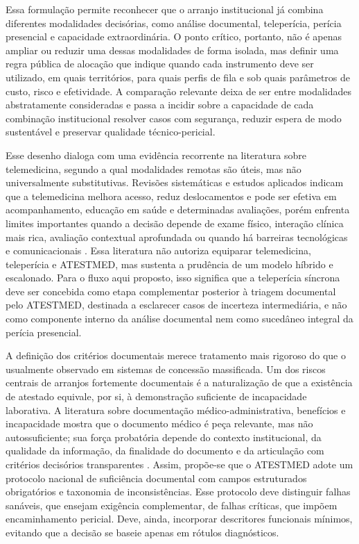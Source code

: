 \documentclass[12pt,a4paper]{article}
\begin{document}
Essa formulação permite reconhecer que o arranjo institucional já combina diferentes modalidades decisórias, como análise documental, teleperícia, perícia presencial e capacidade extraordinária. O ponto crítico, portanto, não é apenas ampliar ou reduzir uma dessas modalidades de forma isolada, mas definir uma regra pública de alocação que indique quando cada instrumento deve ser utilizado, em quais territórios, para quais perfis de fila e sob quais parâmetros de custo, risco e efetividade. A comparação relevante deixa de ser entre modalidades abstratamente consideradas e passa a incidir sobre a capacidade de cada combinação institucional resolver casos com segurança, reduzir espera de modo sustentável e preservar qualidade técnico-pericial.

Esse desenho dialoga com uma evidência recorrente na literatura sobre telemedicina, segundo a qual modalidades remotas são úteis, mas não universalmente substitutivas. Revisões sistemáticas e estudos aplicados indicam que a telemedicina melhora acesso, reduz deslocamentos e pode ser efetiva em acompanhamento, educação em saúde e determinadas avaliações, porém enfrenta limites importantes quando a decisão depende de exame físico, interação clínica mais rica, avaliação contextual aprofundada ou quando há barreiras tecnológicas e comunicacionais \parencite{ftouni2022challengesoftelemedicineduringthecovid19pandemica, guo2017assessmentofaphasiaacrosstheinternationalclassification}. Essa literatura não autoriza equiparar telemedicina, teleperícia e ATESTMED, mas sustenta a prudência de um modelo híbrido e escalonado. Para o fluxo aqui proposto, isso significa que a teleperícia síncrona deve ser concebida como etapa complementar posterior à triagem documental pelo ATESTMED, destinada a esclarecer casos de incerteza intermediária, e não como componente interno da análise documental nem como sucedâneo integral da perícia presencial.

A definição dos critérios documentais merece tratamento mais rigoroso do que o usualmente observado em sistemas de concessão massificada. Um dos riscos centrais de arranjos fortemente documentais é a naturalização de que a existência de atestado equivale, por si, à demonstração suficiente de incapacidade laborativa. A literatura sobre documentação médico-administrativa, benefícios e incapacidade mostra que o documento médico é peça relevante, mas não autossuficiente; sua força probatória depende do contexto institucional, da qualidade da informação, da finalidade do documento e da articulação com critérios decisórios transparentes \parencite{sa2020medicalcertificateofdisabilityadescriptiveanalysisofav, rajasulochana2026doeshavingadisabilitycertificateensurebenefit, dijkstrasdatamakingupincapacityforwork}. Assim, propõe-se que o ATESTMED adote um protocolo nacional de suficiência documental com campos estruturados obrigatórios e taxonomia de inconsistências. Esse protocolo deve distinguir falhas sanáveis, que ensejam exigência complementar, de falhas críticas, que impõem encaminhamento pericial. Deve, ainda, incorporar descritores funcionais mínimos, evitando que a decisão se baseie apenas em rótulos diagnósticos.
\end{document}
